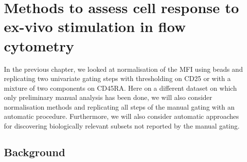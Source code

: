 \chapter{ \label{chapter:il2} Methods to assess cell response to ex-vivo stimulation in flow cytometry }

In the previous chapter, we looked at normalisation of the MFI using beads and replicating two univariate gating steps with thresholding on CD25
or with a mixture of two components on CD45RA.
Here on a different dataset on which only preliminary manual analysis has been done, we will also consider normalisation methods and replicating all steps of the manual gating
with an automatic procedure.
Furthermore, we will also consider automatic approaches for discovering biologically relevant subsets not reported by the manual gating.

\section{Background}

